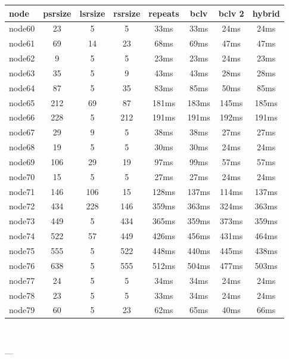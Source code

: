 \begin{tabular}{|l|c|c|c|c|c|c|c|}
\hline node & psrsize & lsrsize & rsrsize   & repeats & bclv & bclv 2 & hybrid\\
    \hline node60 & 23 & 5 & 5 & 33ms & 33ms & 24ms & 24ms\\
    \hline node61 & 69 & 14 & 23 & 68ms & 69ms & 47ms & 47ms\\
    \hline node62 & 9 & 5 & 5 & 23ms & 23ms & 24ms & 23ms\\
    \hline node63 & 35 & 5 & 9 & 43ms & 43ms & 28ms & 28ms\\
    \hline node64 & 87 & 5 & 35 & 83ms & 85ms & 50ms & 85ms\\
    \hline node65 & 212 & 69 & 87 & 181ms & 183ms & 145ms & 185ms\\
    \hline node66 & 228 & 5 & 212 & 191ms & 191ms & 192ms & 191ms\\
    \hline node67 & 29 & 9 & 5 & 38ms & 38ms & 27ms & 27ms\\
    \hline node68 & 19 & 5 & 5 & 30ms & 30ms & 24ms & 24ms\\
    \hline node69 & 106 & 29 & 19 & 97ms & 99ms & 57ms & 57ms\\
    \hline node70 & 15 & 5 & 5 & 27ms & 27ms & 24ms & 24ms\\
    \hline node71 & 146 & 106 & 15 & 128ms & 137ms & 114ms & 137ms\\
    \hline node72 & 434 & 228 & 146 & 359ms & 363ms & 324ms & 363ms\\
    \hline node73 & 449 & 5 & 434 & 365ms & 359ms & 373ms & 359ms\\
    \hline node74 & 522 & 57 & 449 & 426ms & 456ms & 431ms & 464ms\\
    \hline node75 & 555 & 5 & 522 & 448ms & 440ms & 445ms & 438ms\\
    \hline node76 & 638 & 5 & 555 & 512ms & 504ms & 477ms & 503ms\\
    \hline node77 & 24 & 5 & 5 & 34ms & 34ms & 24ms & 24ms\\
    \hline node78 & 23 & 5 & 5 & 33ms & 34ms & 24ms & 24ms\\
    \hline node79 & 60 & 5 & 23 & 62ms & 65ms & 40ms & 66ms\\

\hline
\end{tabular} \

---


